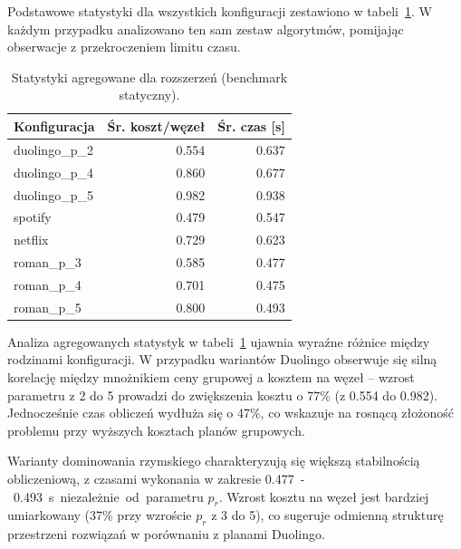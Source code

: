 Podstawowe statystyki dla wszystkich konfiguracji zestawiono w tabeli~\ref{tab:ext-overall-static}. W każdym przypadku analizowano ten sam zestaw algorytmów, pomijając obserwacje z przekroczeniem limitu czasu.

\begin{table}[H]
    \centering
    \caption{Statystyki agregowane dla rozszerzeń (benchmark statyczny).}
    \label{tab:ext-overall-static}
    \begin{tabular}{lrr}
        \toprule
        \textbf{Konfiguracja} & \textbf{Śr. koszt/węzeł} & \textbf{Śr. czas [s]} \\
        \midrule
        duolingo\_p\_2        & 0.554                    & 0.637                 \\
        duolingo\_p\_4        & 0.860                    & 0.677                 \\
        duolingo\_p\_5        & 0.982                    & 0.938                 \\
        spotify               & 0.479                    & 0.547                 \\
        netflix               & 0.729                    & 0.623                 \\
        roman\_p\_3           & 0.585                    & 0.477                 \\
        roman\_p\_4           & 0.701                    & 0.475                 \\
        roman\_p\_5           & 0.800                    & 0.493                 \\
    \end{tabular}
\end{table}

Analiza agregowanych statystyk w tabeli~\ref{tab:ext-overall-static} ujawnia wyraźne różnice między rodzinami konfiguracji. W przypadku wariantów Duolingo obserwuje się silną korelację między mnożnikiem ceny grupowej a kosztem na węzeł -- wzrost parametru z 2 do 5 prowadzi do zwiększenia kosztu o 77\% (z 0.554 do 0.982). Jednocześnie czas obliczeń wydłuża się o 47\%, co wskazuje na rosnącą złożoność problemu przy wyższych kosztach planów grupowych.

Warianty dominowania rzymskiego charakteryzują się większą stabilnością obliczeniową, z czasami wykonania w zakresie \SI{0.477}-\SI{0.493}{\second} niezależnie od parametru $p_r$. Wzrost kosztu na węzeł jest bardziej umiarkowany (37\% przy wzroście $p_r$ z 3 do 5), co sugeruje odmienną strukturę przestrzeni rozwiązań w porównaniu z planami Duolingo.

